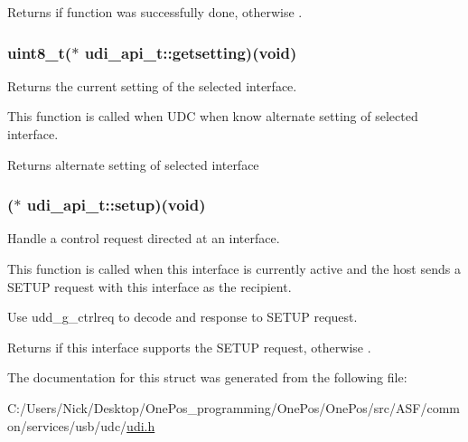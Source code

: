 \begin{DoxyReturn}{Returns}
{} if function was successfully done, otherwise {}. 
\end{DoxyReturn}
\hypertarget{structudi__api__t_ad2b798a7cb160d55ed92162ecb845f97}{
\subsubsection[{getsetting}]{\setlength{\rightskip}{0pt plus 5cm}uint8\-\_\-t($\ast$ udi\-\_\-api\-\_\-t\-::getsetting)(void)}}\label{structudi__api__t_ad2b798a7cb160d55ed92162ecb845f97}


Returns the current setting of the selected interface. 

This function is called when U\-D\-C when know alternate setting of selected interface.

\begin{DoxyReturn}{Returns}
alternate setting of selected interface 
\end{DoxyReturn}
\hypertarget{structudi__api__t_a8161cf3c75c90f630f7d1ee931be821d}{
\subsubsection[{setup}]{($\ast$ udi\-\_\-api\-\_\-t\-::setup)(void)}}\label{structudi__api__t_a8161cf3c75c90f630f7d1ee931be821d}


Handle a control request directed at an interface. 

This function is called when this interface is currently active and the host sends a S\-E\-T\-U\-P request with this interface as the recipient.

Use udd\-\_\-g\-\_\-ctrlreq to decode and response to S\-E\-T\-U\-P request.

\begin{DoxyReturn}{Returns}
{} if this interface supports the S\-E\-T\-U\-P request, otherwise {}. 
\end{DoxyReturn}


The documentation for this struct was generated from the following file\-:\begin{DoxyCompactItemize}
\item 
C\-:/\-Users/\-Nick/\-Desktop/\-One\-Pos\-\_\-programming/\-One\-Pos/\-One\-Pos/src/\-A\-S\-F/common/services/usb/udc/\hyperlink{udi_8h}{udi.\-h}\end{DoxyCompactItemize}
